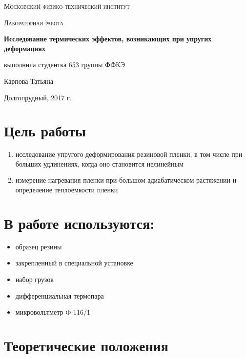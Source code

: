 \documentclass[a4paper]{article}
\begin{document}
\begin{titlepage}
	\centering
	\vspace{5cm}
	{\scshape\LARGE Московский физико-технический институт \par}
	\vspace{4cm}
	{\scshape\Large Лабораторная работа \par}
	\vspace{1cm}
	{\huge\bfseries Исследование термических эффектов, возникающих при упругих деформациях \par}
	\vspace{1cm}
	\vfill
\begin{flushright}
	{\large выполнила студентка 653 группы ФФКЭ}\par
	\vspace{0.3cm}
	{\LARGE Карпова Татьяна}
\end{flushright}
	

	\vfill

	Долгопрудный, 2017 г.
\end{titlepage}

\section {Цель работы}
\begin{enumerate}
    \item исследование упругого деформирования резиновой пленки, в том числе при больших удлинениях, когда оно становится нелинейным
    \item измерение нагревания пленки при большом адиабатическом растяжении и определение теплоемкости пленки
\end{enumerate}

\section{В работе используются:}
\begin{itemize}
    \item образец резины
    \item закрепленный в специальной установке
    \item набор грузов
    \item дифференциальная термопара
    \item микровольтметр Ф-116/1
\end{itemize}

\section{Теоретические положения}
\end{document}
